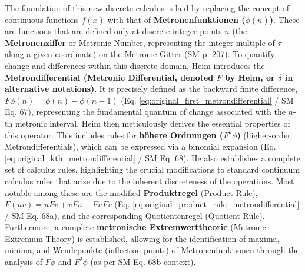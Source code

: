 \documentclass[12pt]{article}
\newcommand{\metron}{\tau}
\newcommand{\metrondifferential}{F} %
\newcommand{\metronenfunktion}{\phi(n)}
\newcommand{\metronenziffer}{n}
\begin{document}
The foundation of this new discrete calculus is laid by replacing the concept of continuous functions \( f(x) \) with that of \textbf{Metronenfunktionen (\( \metronenfunktion \))}. These are functions that are defined only at discrete integer points \( \metronenziffer \) (the \textbf{Metronenziffer} or Metronic Number, representing the integer multiple of \( \metron \) along a given coordinate) on the Metronic Gitter (SM p. 207). To quantify change and differences within this discrete domain, Heim introduces the \textbf{Metrondifferential (Metronic Differential, denoted \( \metrondifferential \) by Heim, or \( \delta \) in alternative notations)}. It is precisely defined as the backward finite difference, \( \metrondifferential\phi(\metronenziffer) = \phi(\metronenziffer) - \phi(\metronenziffer-1) \) (Eq. \eqref{eq:original_first_metrondifferential} / SM Eq. 67), representing the fundamental quantum of change associated with the \( \metronenziffer \)-th metronic interval. Heim then meticulously derives the essential properties of this operator. This includes rules for \textbf{höhere Ordnungen (\( \metrondifferential^k\phi \))} (higher-order Metrondifferentials), which can be expressed via a binomial expansion (Eq. \eqref{eq:original_kth_metrondifferential} / SM Eq. 68). He also establishes a complete set of calculus rules, highlighting the crucial modifications to standard continuum calculus rules that arise due to the inherent discreteness of the operations. Most notable among these are the modified \textbf{Produktregel} (Product Rule), \( \metrondifferential(uv) = u\metrondifferential v + v\metrondifferential u - \metrondifferential u\metrondifferential v \) (Eq. \eqref{eq:original_product_rule_metrondifferential} / SM Eq. 68a), and the corresponding Quotientenregel (Quotient Rule). Furthermore, a complete \textbf{metronische Extremwerttheorie} (Metronic Extremum Theory) is established, allowing for the identification of maxima, minima, and Wendepunkte (inflection points) of Metronenfunktionen through the analysis of \( \metrondifferential\phi \) and \( \metrondifferential^2\phi \) (as per SM Eq. 68b context).
\end{document}
